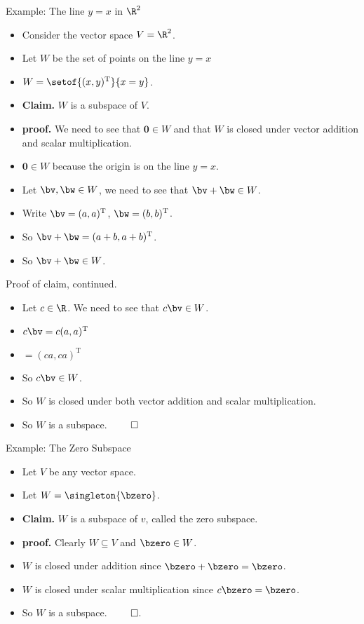 \documentclass{beamer}
\begin{document}
\begin{frame}{Example: The line $y=x$ in $\R^2$}

\begin{itemize}
\item Consider the vector space $V = \R^2$.
\item Let $W$ be the set of points on the line $y=x$
\item $W=\setof{(x,y)^{\text{T}}}{x=y}$.
\item \textbf{Claim.} $W$ is a subspace of $V$.
\item \textbf{proof.} We need to see that $\textbf{0}\in W$ and that
$W$ is closed under vector
addition and scalar multiplication.
\item $\textbf{0} \in W$ because the origin is on the line $y=x$.
\item Let $\bv,\bw\in W$, we need to see that $\bv+\bw\in W$.
\item Write $\bv=(a,a)^{\text{T}}$, $\bw = (b,b)^{\text{T}}$.
\item So $\bv+\bw = (a+b,a+b)^{\text{T}}$.
\item So $\bv+\bw \in W$.
\end{itemize}
\end{frame}


\begin{frame}{Proof of claim, continued.}

\begin{itemize}
\item Let $c\in \R$. We need to see that $c \bv\in W$.
\item $c\bv = c(a,a)^{\text{T}}$
\item $=(ca,ca)^{\text{T}}$
\item So $c\bv\in W$.
\item So $W$ is closed under both vector addition and scalar multiplication.
\item So $W$ is a subspace. $\qed$
\end{itemize}
\end{frame}

\begin{frame}{Example: The Zero Subspace}

\begin{itemize}
\item Let $V$ be any vector space.
\item Let $W=\singleton{\bzero}$.
\item \textbf{Claim.} $W$ is a subspace of $v$, called the zero subspace.
\item \textbf{proof.} Clearly $W\subseteq V$ and $\bzero\in W$.
\item $W$ is closed under addition since $\bzero+\bzero=\bzero$.
\item $W$ is closed under scalar multiplication since $c\bzero=\bzero$.
\item So $W$ is a subspace. $\qed$.
\end{itemize}
\end{frame}
\end{document}
